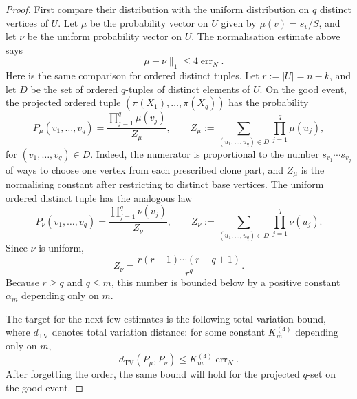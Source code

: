 \documentclass[11pt]{article}
\theoremstyle{definition}
\begin{document}
\begin{proof}
First compare their distribution with the uniform distribution on $q$ distinct
vertices of $U$.  Let $\mu$ be the probability vector on $U$ given by
$\mu(v)=s_v/S$, and let $\nu$ be the uniform probability vector on $U$.  The
normalisation estimate above says
\[
  \|\mu-\nu\|_1\le 4\operatorname{err}_N .
\]
Here is the same comparison for ordered distinct tuples.  Let $r:=|U|=n-k$, and
let $D$ be the set of ordered $q$-tuples of distinct elements of $U$.  On the
good event, the projected ordered tuple $(\pi(X_1),\ldots,\pi(X_q))$ has the
probability
\[
  P_\mu(v_1,\ldots,v_q)
  =
  \frac{\prod_{j=1}^q \mu(v_j)}
       {Z_\mu},
  \qquad
  Z_\mu:=\sum_{(u_1,\ldots,u_q)\in D}\prod_{j=1}^q \mu(u_j),
\]
for $(v_1,\ldots,v_q)\in D$.  Indeed, the numerator is proportional to the
number $s_{v_1}\cdots s_{v_q}$ of ways to choose one vertex from each prescribed
clone part, and $Z_\mu$ is the normalising constant after restricting to
distinct base vertices.  The uniform ordered distinct tuple has the analogous law
\[
  P_\nu(v_1,\ldots,v_q)
  =
  \frac{\prod_{j=1}^q \nu(v_j)}
       {Z_\nu},
  \qquad
  Z_\nu:=\sum_{(u_1,\ldots,u_q)\in D}\prod_{j=1}^q \nu(u_j).
\]
Since $\nu$ is uniform,
\[
  Z_\nu=\frac{r(r-1)\cdots(r-q+1)}{r^q}.
\]
Because $r\ge q$ and $q\le m$, this number is bounded below by a positive
constant $\alpha_m$ depending only on $m$.

The target for the next few estimates is the following total-variation bound,
where $d_{\mathrm{TV}}$ denotes total variation distance: for some constant
$K_m^{(4)}$ depending only on $m$,
\begin{equation}\label{eq:ordered-good-tv-target}
  d_{\mathrm{TV}}(P_\mu,P_\nu)\le K_m^{(4)}\operatorname{err}_N .
\end{equation}
After forgetting the order, the same bound will hold for the projected $q$-set
on the good event.


\end{proof}
\end{document}
